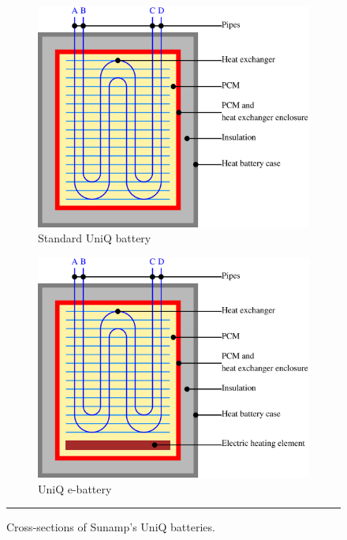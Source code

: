 \begin{figure}[htbp]
	\centering
	\begin{subfigure}{.48\textwidth}
		\centering
		\includegraphics[width=\textwidth]{figures/UniQ_std_cross-section.eps}
		\caption{Standard UniQ battery}
		\label{fig:uniq_cross-section}
	\end{subfigure}
	\begin{subfigure}{.48\textwidth}
		\centering
		\includegraphics[width=\textwidth]{figures/eUniQ_cross-section.eps}
		\caption{UniQ e-battery}
		\label{fig:euniq_cross-section}
	\end{subfigure}
	\rule{\textwidth}{0.5pt} %
	\caption{Cross-sections of Sunamp's UniQ batteries.}
	\label{fig:cross-sections}
\end{figure}



